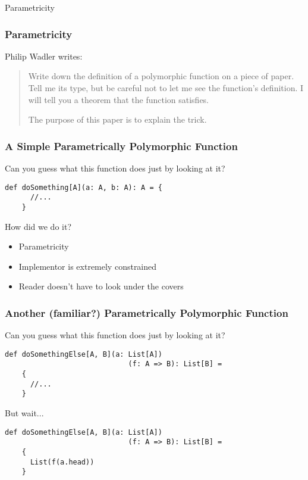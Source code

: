 \begin{section}{Parametricity}
\begin{frame}
\frametitle{Parametricity}
\begin{block}{Philip Wadler \cite{Wadler89theoremsfor} writes:}
\begin{quotation}
Write down the definition of a polymorphic function on a piece of paper. Tell me its type, but be careful not to let me see the function's definition. I will tell you a theorem that the function satisfies.

The purpose of this paper is to explain the trick.
\end{quotation}
\end{block}
\end{frame}

\begin{frame}[fragile]
\frametitle{A Simple Parametrically Polymorphic Function}
  Can you guess what this function does just by looking at it?
  \begin{lstlisting}[style=scala]
    def doSomething[A](a: A, b: A): A = {
      //...
    }
  \end{lstlisting}
\end{frame}

\begin{frame}{How did we do it?}
  \begin{center}
    \begin{itemize}
    \item Parametricity
    \item Implementor is extremely constrained
    \item Reader doesn't have to look under the covers
    \end{itemize}
\end{center}
\end{frame}

\begin{frame}[fragile]
\frametitle{Another (familiar?) Parametrically Polymorphic Function}
  Can you guess what this function does just by looking at it?
  \begin{lstlisting}[style=scala]
    def doSomethingElse[A, B](a: List[A])
                             (f: A => B): List[B] =
    {
      //...
    }
  \end{lstlisting}
\end{frame}

\begin{frame}[fragile]{But wait...}
    \begin{lstlisting}[style=scala]
    def doSomethingElse[A, B](a: List[A])
                             (f: A => B): List[B] =
    {
      List(f(a.head))
    }
  \end{lstlisting}
\end{frame}


\end{section}
